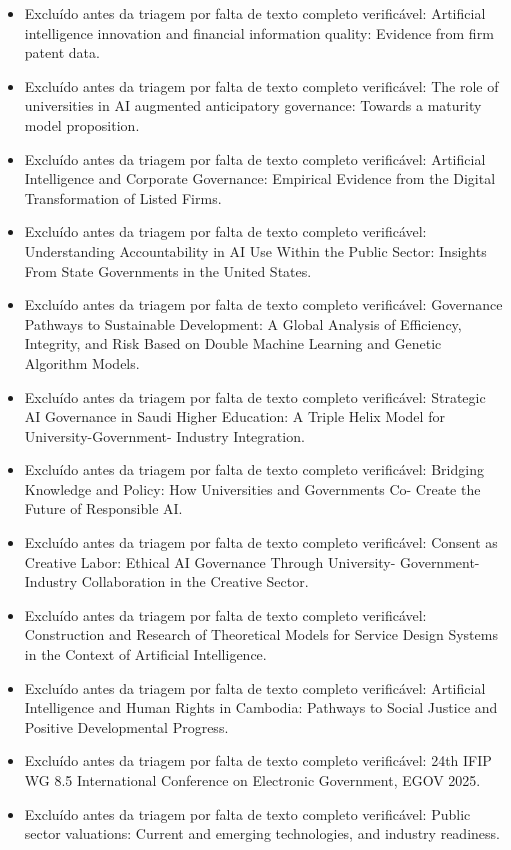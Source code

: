 \documentclass[12pt,a4paper]{article}
\begin{document}
\begin{itemize}
\item Excluído antes da triagem por falta de texto completo verificável: Artificial intelligence innovation and financial information quality: Evidence from firm patent data.
\item Excluído antes da triagem por falta de texto completo verificável: The role of universities in AI augmented anticipatory governance: Towards a maturity model proposition.
\item Excluído antes da triagem por falta de texto completo verificável: Artificial Intelligence and Corporate Governance: Empirical Evidence from the Digital Transformation of Listed Firms.
\item Excluído antes da triagem por falta de texto completo verificável: Understanding Accountability in AI Use Within the Public Sector: Insights From State Governments in the United States.
\item Excluído antes da triagem por falta de texto completo verificável: Governance Pathways to Sustainable Development: A Global Analysis of Efficiency, Integrity, and Risk Based on Double Machine Learning and Genetic Algorithm Models.
\item Excluído antes da triagem por falta de texto completo verificável: Strategic AI Governance in Saudi Higher Education: A Triple Helix Model for University-Government- Industry Integration.
\item Excluído antes da triagem por falta de texto completo verificável: Bridging Knowledge and Policy: How Universities and Governments Co- Create the Future of Responsible AI.
\item Excluído antes da triagem por falta de texto completo verificável: Consent as Creative Labor: Ethical AI Governance Through University- Government-Industry Collaboration in the Creative Sector.
\item Excluído antes da triagem por falta de texto completo verificável: Construction and Research of Theoretical Models for Service Design Systems in the Context of Artificial Intelligence.
\item Excluído antes da triagem por falta de texto completo verificável: Artificial Intelligence and Human Rights in Cambodia: Pathways to Social Justice and Positive Developmental Progress.
\item Excluído antes da triagem por falta de texto completo verificável: 24th IFIP WG 8.5 International Conference on Electronic Government, EGOV 2025.
\item Excluído antes da triagem por falta de texto completo verificável: Public sector valuations: Current and emerging technologies, and industry readiness.

\end{itemize}
\end{document}
